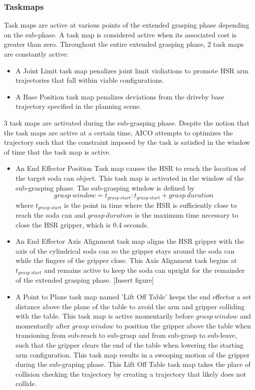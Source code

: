 \documentclass[12pt]{article}
\begin{document}
            \subsubsection{Taskmaps}
                Task maps are active at various points of the extended grasping phase depending on the sub-phase. A task map is considered active when its associated cost is greater than zero. Throughout the entire extended grasping phase, 2 task maps are constantly active:
                \begin{itemize}
                    \item A Joint Limit task map penalizes joint limit violiations to promote HSR arm trajectories that fall within viable configurations.

                    \item A Base Position task map penalizes deviations from the driveby base trajectory specified in the planning scene.
                \end{itemize}
                3 task maps are activated during the sub-grasping phase. Despite the notion that the task maps are active at a certain time, AICO attempts to optimizes the trajectory such that the constraint imposed by the task is satisfied in the window of time that the task map is active.
                \begin{itemize}
                    \item An End Effector Position Task map causes the HSR to reach the location of the target soda can object. This task map is activated in the window of the sub-grasping phase. The sub-grasping window is defined by 
                    \[{grasp\ window} = t_{grasp\ start}: t_{grasp\ start}+grasp\  duration\] 
                    where \(t_{grasp\ start}\) is the point in time where the HSR is sufficiently close to reach the soda can and \({grasp\ duration}\) is the maximum time necessary to close the HSR gripper, which is 0.4 seconds.

                    \item An End Effector Axis Alignment task map aligns the HSR gripper with the axis of the cylindrical soda can so the gripper stays around the soda can while the fingers of the gripper close. This Axis Alignment task begins at \(t_{grasp\ start}\) and remains active to keep the soda can upright for the remainder of the extended grasping phase.
                    [Insert figure]

                    \item A Point to Plane task map named 'Lift Off Table' keeps the end effector a set distance above the plane of the table to avoid the arm and gripper colliding with the table. This task map is active momentarily before \({grasp\ window}\) and momentarily after \({grasp\ window}\) to position the gripper above the table when transioning from sub-reach to sub-grasp and from sub-grasp to sub-leave, such that the gripper clears the end of the table when lowering the starting arm configuration. This task map results in a swooping motion of the gripper during the sub-graping phase. This Lift Off Table task map takes the place of collision checking the trajectory by creating a trajectory that likely does not collide.
                \end{itemize}
\end{document}
